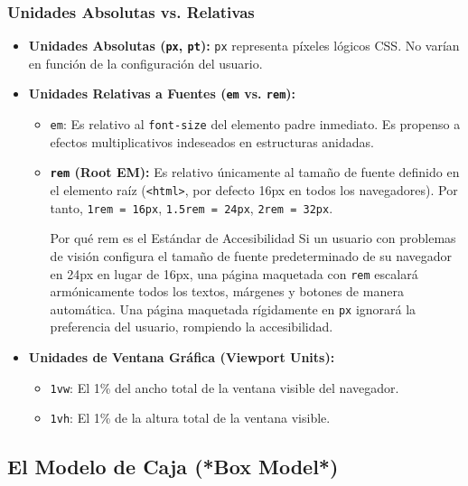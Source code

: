 \subsubsection{Unidades Absolutas vs. Relativas}
\begin{itemize}[leftmargin=1.2cm]
  \item \textbf{Unidades Absolutas (\texttt{px}, \texttt{pt}):} \texttt{px} representa píxeles lógicos CSS. No varían en función de la configuración del usuario.
  \item \textbf{Unidades Relativas a Fuentes (\texttt{em} vs. \texttt{rem}):}
    \begin{itemize}
      \item \texttt{em}: Es relativo al \texttt{font-size} del elemento padre inmediato. Es propenso a efectos multiplicativos indeseados en estructuras anidadas.
      \item \textbf{\texttt{rem} (Root EM):} Es relativo únicamente al tamaño de fuente definido en el elemento raíz (\texttt{<html>}, por defecto 16px en todos los navegadores). Por tanto, \texttt{1rem = 16px}, \texttt{1.5rem = 24px}, \texttt{2rem = 32px}.\\
      \begin{importante}{Por qué rem es el Estándar de Accesibilidad}
      Si un usuario con problemas de visión configura el tamaño de fuente predeterminado de su navegador en 24px en lugar de 16px, una página maquetada con \texttt{rem} escalará armónicamente todos los textos, márgenes y botones de manera automática. Una página maquetada rígidamente en \texttt{px} ignorará la preferencia del usuario, rompiendo la accesibilidad.
      \end{importante}
    \end{itemize}
  \item \textbf{Unidades de Ventana Gráfica (Viewport Units):}
    \begin{itemize}
      \item \texttt{1vw}: El 1\% del ancho total de la ventana visible del navegador.
      \item \texttt{1vh}: El 1\% de la altura total de la ventana visible.
    \end{itemize}
\end{itemize}

\subsection{El Modelo de Caja (*Box Model*)}

